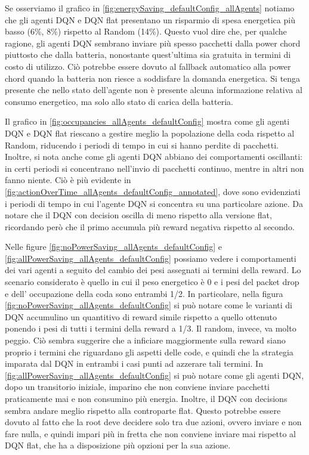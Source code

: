 \documentclass[conference]{IEEEtran}
\begin{document}
Se osserviamo il grafico in \autoref{fig:energySaving_defaultConfig_allAgents} notiamo
che gli agenti DQN e DQN flat presentano un risparmio di spesa energetica più
basso (6\%, 8\%) rispetto al Random (14\%). Questo vuol dire che, per qualche ragione,
gli agenti DQN
sembrano inviare più spesso pacchetti dalla power chord piuttosto che dalla batteria,
nonostante quest'ultima sia gratuita in termini di costo di utilizzo. Ciò potrebbe
essere dovuto al fallback automatico alla power chord quando la batteria non riesce
a soddisfare la domanda energetica. Si tenga presente che nello stato dell'agente non
è presente alcuna informazione relativa al consumo energetico, ma solo allo stato
di carica della batteria.

Il grafico in \autoref{fig:occupancies_allAgents_defaultConfig} mostra come gli agenti
DQN e DQN flat riescano a gestire meglio la popolazione della coda rispetto al
Random, riducendo i periodi di tempo in cui si hanno perdite di pacchetti. Inoltre,
si nota anche come gli agenti DQN abbiano dei comportamenti oscillanti: in certi periodi
si concentrano nell'invio di pacchetti continuo, mentre in altri non fanno niente. Ciò
è più evidente in \autoref{fig:actionOverTime_allAgents_defaultConfig_annotated}, dove
sono evidenziati i periodi di tempo in cui l'agente DQN si concentra su una particolare
azione. Da notare che il DQN con decision oscilla di meno rispetto alla versione flat,
ricordando però che il primo accumula più reward negativa rispetto al secondo.

Nelle figure \autoref{fig:noPowerSaving_allAgents_defaultConfig} e 
\autoref{fig:allPowerSaving_allAgents_defaultConfig} possiamo vedere i comportamenti dei
vari agenti a seguito del cambio dei pesi assegnati ai termini della reward. Lo scenario 
considerato è quello in cui il peso energetico è 0 e i pesi del packet drop e dell'
occupazione della coda sono entrambi 1/2.
In particolare, nella figura \autoref{fig:noPowerSaving_allAgents_defaultConfig} si può
notare come le varianti di DQN accumulino un quantitivo di reward simile rispetto a
quello ottenuto ponendo i pesi di tutti i termini della reward a 1/3. 
Il random, invece, va molto peggio. Ciò sembra suggerire che a inficiare
maggiormente sulla reward siano proprio i termini che riguardano gli aspetti delle code,
e quindi che la strategia imparata dal DQN in entrambi i casi punti ad azzerare tali
termini. In \autoref{fig:allPowerSaving_allAgents_defaultConfig} si può notare come
gli agenti DQN, dopo un transitorio iniziale, imparino che non conviene inviare pacchetti
praticamente mai e non consumino più energia. Inoltre, il DQN con decisions sembra 
andare meglio rispetto alla controparte flat. Questo potrebbe essere dovuto al fatto
che la root deve decidere solo tra due azioni, ovvero inviare e non fare nulla, e quindi
impari più in fretta che non conviene inviare mai rispetto al DQN flat, che ha a 
disposizione più opzioni per la sua azione.
\end{document}
